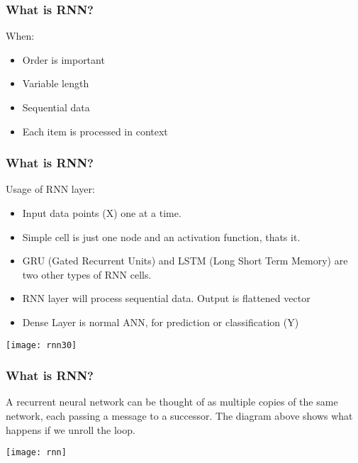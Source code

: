 \begin{frame}[fragile] \frametitle{What is RNN?}
When:
\begin{itemize}
\item Order is important
\item Variable length
\item Sequential data
\item Each item is processed in context
\end{itemize}

\end{frame}


\begin{frame}[fragile] \frametitle{What is RNN?}
Usage of RNN layer:
\begin{itemize}
\item Input data points (X) one at a time.
\item Simple cell is just one node and an activation function, thats it.
\item GRU (Gated Recurrent Units) and LSTM (Long Short Term Memory) are two other types of RNN cells.
\item RNN layer will process sequential data. Output is flattened vector
\item Dense Layer is normal ANN, for prediction or classification (Y)
\end{itemize}


\begin{center}
\texttt{[image: rnn30]}
\end{center}
\end{frame}

\begin{frame}[fragile] \frametitle{What is RNN?}

A recurrent neural network can be thought of as multiple copies of the same network, each passing a message to a successor. 
The diagram above shows what happens if we unroll the loop. 

\begin{center}
\texttt{[image: rnn]}
\end{center}
\end{frame}


